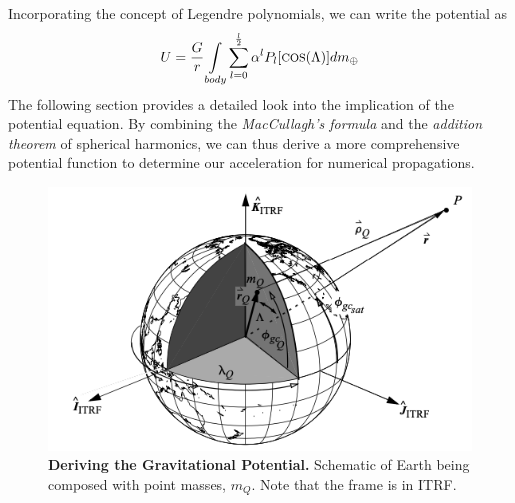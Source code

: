 \begin{multicols}{2}
\begin{gather}
\end{gather}
Incorporating the concept of Legendre polynomials, we can write the potential as
\begin{gather}
    U = \frac{G}{r}\underset{body}{\int}\sum_{l=0}^{\frac{l}{2}}\alpha^lP_l[\text{\footnotesize{COS}}(\Lambda)]dm_\oplus
    \label{eq:Potential}
\end{gather}
The following section provides a detailed look into the implication of the potential equation. By combining the \textit{MacCullagh's formula} and the \textit{addition theorem} of spherical harmonics, we can thus derive a more comprehensive potential function to determine our acceleration for numerical propagations. 
\end{multicols}
\begin{figure}[H]
    \centering
    \includegraphics[width=.55\textwidth]{perturbation/point_mass.png}
    \caption{\textbf{Deriving the Gravitational Potential.} Schematic of Earth being composed with point masses, $m_Q$. Note that the frame is in ITRF\cite[]{}.}
    \label{fig:point_mass}
\end{figure}
